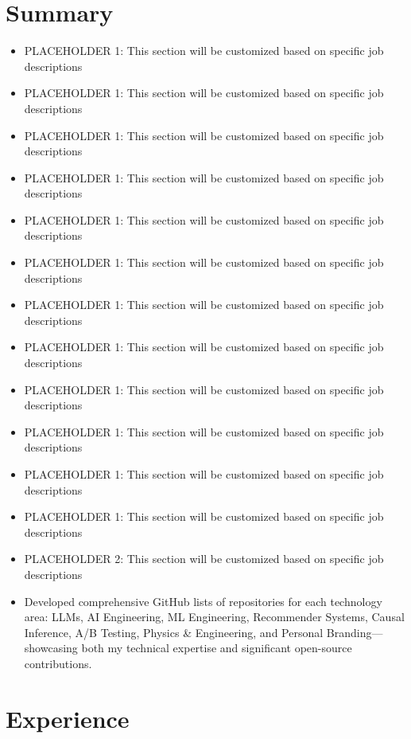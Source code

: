 \documentclass[11pt]{article} %
\begin{document}
\section{Summary}
\begin{itemize}
	\item PLACEHOLDER 1: This section will be customized based on specific job descriptions
	\item PLACEHOLDER 1: This section will be customized based on specific job descriptions
	\item PLACEHOLDER 1: This section will be customized based on specific job descriptions
	\item PLACEHOLDER 1: This section will be customized based on specific job descriptions
	\item PLACEHOLDER 1: This section will be customized based on specific job descriptions
	\item PLACEHOLDER 1: This section will be customized based on specific job descriptions
	\item PLACEHOLDER 1: This section will be customized based on specific job descriptions
	\item PLACEHOLDER 1: This section will be customized based on specific job descriptions
	\item PLACEHOLDER 1: This section will be customized based on specific job descriptions
	\item PLACEHOLDER 1: This section will be customized based on specific job descriptions
	\item PLACEHOLDER 1: This section will be customized based on specific job descriptions
	\item PLACEHOLDER 1: This section will be customized based on specific job descriptions
	\item PLACEHOLDER 2: This section will be customized based on specific job descriptions
	\item Developed comprehensive GitHub lists of repositories for each technology area: LLMs, AI Engineering, ML Engineering, Recommender Systems, Causal Inference, A/B Testing, Physics \& Engineering, and Personal Branding—showcasing both my technical expertise and significant open-source contributions.
\end{itemize}

\section{Experience}
\end{document}
